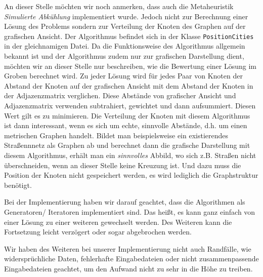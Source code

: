 An dieser Stelle möchten wir noch anmerken, dass auch die Metaheuristik \emph{Simulierte Abkühlung} implementiert wurde. Jedoch nicht zur Berechnung einer Lösung des Problems sondern zur Verteilung der Knoten des Graphen auf der grafischen Ansicht. Der Algorithmus befindet sich in der Klasse \texttt{PositionCities} in der gleichnamigen Datei. Da die Funktionsweise des Algorithmus allgemein bekannt ist und der Algorithmus zudem nur zur grafischen Darstellung dient, möchten wir an dieser Stelle nur beschreiben, wie die Bewertung einer Lösung im Groben berechnet wird. Zu jeder Lösung wird für jedes Paar von Knoten der Abstand der Knoten auf der grafischen Ansicht mit dem Abstand der Knoten in der Adjazenzmatrix verglichen. Diese Abstände von grafischer Ansicht und Adjazenzmatrix verwenden subtrahiert, gewichtet und dann aufsummiert. Diesen Wert gilt es zu minimieren. Die Verteilung der Knoten mit diesem Algorithmus ist dann interessant, wenn es sich um echte, sinnvolle Abstände, d.h. um einen metrischen Graphen handelt. Bildet man beispielsweise ein existierendes Straßennnetz als Graphen ab und berechnet dann die grafische Darstellung mit diesem Algorithmus, erhält man ein \emph{sinnvolles} Abbild, wo sich z.B. Straßen nicht überschneiden, wenn an dieser Stelle keine Kreuzung ist. Und dazu muss die Position der Knoten nicht gespeichert werden, es wird lediglich die Graphstruktur benötigt.

Bei der Implementierung haben wir darauf geachtet, dass die Algorithmen als Generatoren/ Iteratoren implementiert sind. Das heißt, es kann ganz einfach von einer Lösung zu einer weiteren gewechselt werden. Des Weiteren kann die Fortsetzung leicht verzögert oder sogar abgebrochen werden.

Wir haben des Weiteren bei unserer Implementierung nicht auch Randfälle, wie widersprüchliche Daten, fehlerhafte Eingabedateien oder nicht zusammenpassende Eingabedateien geachtet, um den Aufwand nicht zu sehr in die Höhe zu treiben.



